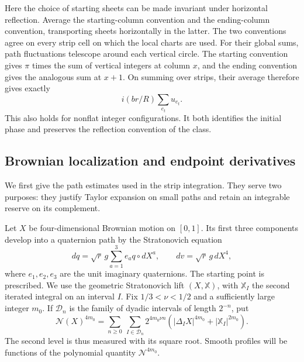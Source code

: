 Here the choice of starting sheets can be made invariant under horizontal
reflection.  Average the starting-column convention and the ending-column
convention, transporting sheets horizontally in the latter.  The two
conventions agree on every strip cell on which the local charts are used.
For their global sums, path fluctuations telescope around each vertical
circle.  The starting convention gives $\pi$ times the sum of vertical
integers at column $x$, and the ending convention gives the analogous
sum at $x+1$.  On summing over strips, their average therefore gives
exactly
\[
 i(br/R)\sum_{e_t}u_{e_t}.
\]
This also holds for nonflat integer configurations.  It both identifies
the initial phase and preserves the reflection convention of the class.

\subsection{Brownian localization and endpoint derivatives}

We first give the path estimates used in the strip integration.  They
serve two purposes: they justify Taylor expansion on small paths and
retain an integrable reserve on its complement.

Let $X$ be four-dimensional Brownian motion on $[0,1]$.  Its first three
components develop into a quaternion path by the Stratonovich equation
\[
 dq=\sqrt r\,g\sum_{a=1}^3 e_aq\circ dX^a,
 \qquad dv=\sqrt r\,g\,dX^4,
\]
where $e_1,e_2,e_3$ are the unit imaginary quaternions.  The starting point
is prescribed.  We use the geometric Stratonovich lift
$(X,\mathbb X)$, with $\mathbb X_I$ the second iterated integral on an
interval $I$.  Fix $1/3<\nu<1/2$ and a sufficiently large integer $m_0$.
If $\mathcal D_n$ is the family of dyadic intervals of length $2^{-n}$,
put
\begin{equation}
 \mathcal N(X)^{4m_0}
 =\sum_{n\ge0}\ \sum_{I\in\mathcal D_n}
 2^{4m_0\nu n}
 \left(|\Delta_I X|^{4m_0}+|\mathbb X_I|^{2m_0}\right).
 \label{eq:init-rough-size}
\end{equation}
The second level is thus measured with its square root.  Smooth profiles
will be functions of the polynomial quantity $\mathcal N^{4m_0}$.

